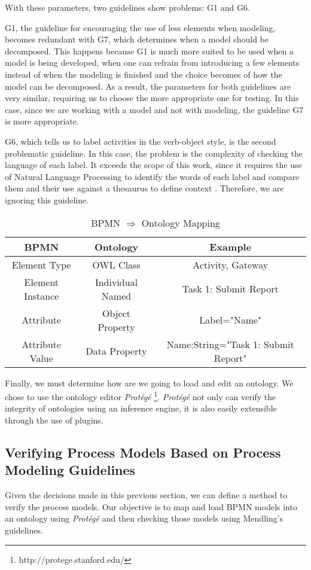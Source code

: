 \documentclass[a4paper,twoside]{article}
\begin{document}
With these parameters, two guidelines show problems: G1 and G6.

G1, the guideline for encouraging the use of less elements when modeling, becomes redundant with G7, which determines when a model should be decomposed. This happens because G1 is much more suited to be used when a model is being developed, when one can refrain from introducing a few elements instead of when the modeling is finished and the choice becomes of how the model can be decomposed. As a result, the parameters for both guidelines are very similar, requiring us to choose the more appropriate one for testing. In this case, since we are working with a model and not with modeling, the guideline G7 is more appropriate.

G6, which tells us to label activities in the verb-object style, is the second problematic guideline. In this case, the problem is the complexity of checking the language of each label. It exceeds the scope of this work, since it requires the use of Natural Language Processing to identify the words of each label and compare them and their use against a thesaurus to define context \cite{gassen2014business}. Therefore, we are ignoring this guideline.

\begin{table*}[]
	\caption{BPMN $\Rightarrow$ Ontology Mapping}
	\label{bpmnOntologyMapping}
	\centering
	\begin{tabular}{| c |c |c |}
		\hline
		BPMN & Ontology & Example \\
		\hline
		Element Type & OWL Class & Activity, Gateway \\\hline
		Element Instance & Individual Named & Task 1: Submit Report \\  \hline
		Attribute & Object Property & Label="Name" \\\hline
		Attribute Value & Data Property & Name:String="Task 1: Submit Report" \\ 
		\hline
	\end{tabular} 
\end{table*}


Finally, we must determine how are we going to load and edit an ontology. We chose to use the ontology editor \textit{Protégé} \footnote{http://protege.stanford.edu/}. \textit{Protégé} not only can verify the integrity of ontologies using an inference engine, it is also easily extensible through the use of plugins. %

\subsection{Verifying Process Models Based on Process Modeling Guidelines}
\noindent Given the decisions made in this previous section, we can define a method to verify the process models. Our objective is to map and load BPMN models into an ontology using \textit{Protégé} and then checking those models using Mendling's guidelines.
\end{document}

